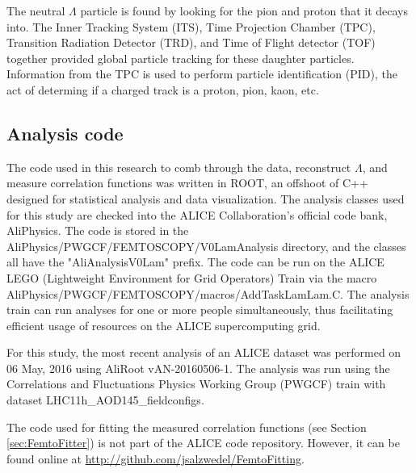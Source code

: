 The neutral $\Lambda$ particle is found by looking for the pion and proton that it decays into.
The Inner Tracking System (ITS), Time Projection Chamber (TPC), Transition Radiation Detector (TRD), and Time of Flight detector (TOF) together provided global particle tracking for these daughter particles.
Information from the TPC is used to perform particle identification (PID), the act of determing if a charged track is a proton, pion, kaon, etc.


\subsection{Analysis code}
The code used in this research to comb through the data, reconstruct $\Lambda$, and measure correlation functions was written in ROOT, an offshoot of C++ designed for statistical analysis and data visualization.
The analysis classes used for this study are checked into the ALICE Collaboration's official code bank, AliPhysics.
The code is stored in the AliPhysics/PWGCF/FEMTOSCOPY/V0LamAnalysis directory, and the classes all have the "AliAnalysisV0Lam" prefix.
The code can be run on the ALICE LEGO (Lightweight Environment for Grid Operators) Train via the macro AliPhysics/PWGCF/FEMTOSCOPY/macros/AddTaskLamLam.C.
The analysis train can run analyses for one or more people simultaneously, thus facilitating efficient usage of resources on the ALICE supercomputing grid.

For this study, the most recent analysis of an ALICE dataset was performed on 06 May, 2016 using AliRoot vAN-20160506-1.
The analysis was run using the Correlations and Fluctuations Physics Working Group (PWGCF) train with dataset LHC11h\_AOD145\_fieldconfigs.

The code used for fitting the measured correlation functions (see Section \ref{sec:FemtoFitter}) is not part of the ALICE code repository.
However, it can be found online at \url{http://github.com/jsalzwedel/FemtoFitting}.
